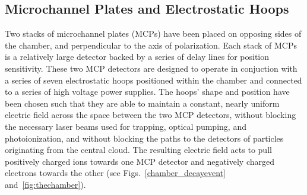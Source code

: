 \subsection{Microchannel Plates and Electrostatic Hoops}
\label{section:mcps}
\label{section:field}
Two stacks of microchannel plates (MCPs) have been placed on opposing sides of the chamber, and perpendicular to the axis of polarization.  Each stack of MCPs is a relatively large detector backed by a series of delay lines for position sensitivity.  These two MCP detectors are designed to operate in conjuction with a series of seven electrostatic hoops positioned within the chamber and connected to a series of high voltage power supplies.  The hoops' shape and position have been chosen such that they are able to maintain  
a constant, nearly uniform electric field across the space between the two MCP detectors, without blocking the necessary laser beams used for trapping, optical pumping, and photoionization, and without blocking the paths to the detectors of particles originating from the central cloud.
The resulting electric field acts to pull positively charged ions towards one MCP detector and negatively charged electrons towards the other (see Figs.~\ref{chamber_decayevent} and~\ref{fig:thechamber}).  

